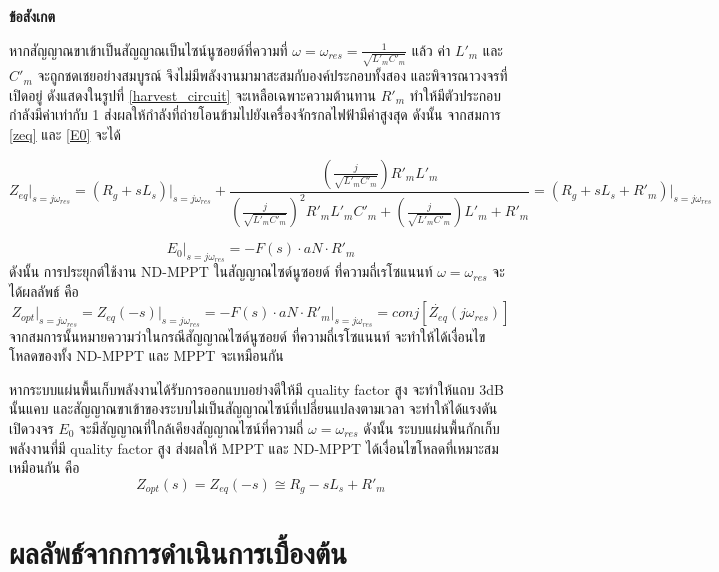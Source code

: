 \documentclass[11pt,a4paper]{article}
\begin{document}
\textbf{ข้อสังเกต}

หากสัญญาณขาเข้าเป็นสัญญาณเป็นไซน์นูซอยด์ที่ความที่ $\omega = \omega_{res} = \frac{1}{\sqrt{L'_{m}C'_{m}}}$ แล้ว 
ค่า $ L'_{m} $ และ $ C'_{m} $ จะถูกชดเชยอย่างสมบูรณ์ จึงไม่มีพลังงานมามาสะสมกับองค์ประกอบทั้งสอง และพิจารณาวงจรที่เปิดอยู่ ดังแสดงในรูปที่ \ref{harvest_circuit} จะเหลือเฉพาะความต้านทาน $R'_{m}$ ทำให้มีตัวประกอบกำลังมีค่าเท่ากับ 1 ส่งผลให้กำลังที่ถ่ายโอนข้ามไปยังเครื่องจักรกลไฟฟ้ามีค่าสูงสุด ดังนั้น จากสมการ \ref{zeq} และ \ref{E0} จะได้

\begin{equation} 
    Z_{eq}\vert_{s = j\omega_{res}} = (R_{g} + sL_{s}) \vert_{s = j\omega_{res}} + \frac{ ( \frac{j}{\sqrt{L'_{m}C'_{m}}} ) R'_{m}L'_{m} }{ ( \frac{j}{\sqrt{L'_{m}C'_{m}}} )^2R'_{m}L'_{m}C'_{m} + ( \frac{j}{\sqrt{L'_{m}C'_{m}}} )L'_{m} + R'_{m}} = (R_{g} + sL_{s} + R'_{m} )\vert_{s = j\omega_{res}}
\end{equation}

\begin{equation}
    E_{0}\vert_{s = j\omega_{res}} = -F(s) \cdot aN \cdot R'_{m}
\end{equation}
ดังนั้น การประยุกต์ใช้งาน ND-MPPT ในสัญญาณไซด์นูซอยด์ ที่ความถี่เรโซแนนท์ $\omega = \omega_{res}$ จะได้ผลลัพธ์ คือ
\begin{equation}
    Z_{opt}\vert_{s = j\omega_{res}} = Z_{eq}(-s)\vert_{s = j\omega_{res}} = -F(s) \cdot aN \cdot R'_{m} \vert_{s = j\omega_{res}} = conj [ {\dot{ Z_{eq} } (j\omega_{res})} ] 
\end{equation}
จากสมการนั้นหมายความว่าในกรณีสัญญาณไซด์นูซอยด์ ที่ความถี่เรโซแนนท์ จะทำให้ได้เงื่อนไขโหลดของทั้ง ND-MPPT และ MPPT จะเหมือนกัน 

หากระบบแผ่นพื้นเก็บพลังงานได้รับการออกแบบอย่างดีให้มี quality factor สูง จะทำให้แถบ 3dB นั้นแคบ และสัญญาณขาเข้าของระบบไม่เป็นสัญญาณไซน์ที่เปลี่ยนแปลงตามเวลา 
จะทำให้ได้แรงดันเปิดวงจร $E_{0}$ จะมีสัญญาณที่ใกล้เคียงสัญญาณไซน์ที่ความถี่ $\omega = \omega_{res}$ ดังนั้น ระบบแผ่นพื้นกักเก็บพลังงานที่มี quality factor สูง ส่งผลให้ MPPT และ ND-MPPT ได้เงื่อนไขโหลดที่เหมาะสมเหมือนกัน คือ
\begin{equation} \label{}
    Z_{opt}(s)= Z_{eq}(-s) \cong R_g- sL_{s} + R'_{m}  
\end{equation}


\newpage

\section{ผลลัพธ์จากการดำเนินการเบื้องต้น}
\end{document}
